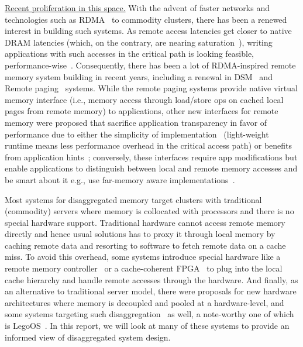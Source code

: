 \vspace{5pt}
\noindent \uline{Recent proliferation in this space.}
With the advent of faster networks and technologies such as 
RDMA~\cite{farm} to commodity clusters, there has been a renewed 
interest in building such systems. 
As remote access latencies 
get closer to native DRAM latencies (which, on the contrary, 
are nearing saturation~\cite{Aguilera2017}),
writing applications with such accesses 
in the critical path is looking feasible, 
performance-wise~\cite{netdisagg}. 
Consequently, there has been a lot of RDMA-inspired remote 
memory system building in recent years, including a renewal in
DSM~\cite{farm, gam,dspm,ltdsm} and Remote 
paging~\cite{Lim2012,bladedisagg1,infiniswap,zswap,fastswap,leap} 
systems. While the remote paging systems provide native virtual memory 
interface (i.e., memory access through load/store ops on cached 
local pages from remote memory) to applications, 
other new interfaces for remote memory were proposed that 
sacrifice application transparency in favor of performance 
due to either the simplicity of 
implementation~\cite{remregions,literdma} (light-weight runtime 
means less performance overhead in the critical access path) or 
benefits from application hints~\cite{aifm}; 
conversely, these interfaces require app modifications but
enable applications to distinguish between local and remote 
memory accesses and be smart about it e.g., use far-memory 
aware implementations~\cite{Aguilera2019,semeru}.

Most systems for disaggregated memory target clusters with 
traditional (commodity) servers where memory is collocated 
with processors and there is no special hardware support.
Traditional hardware cannot access remote memory directly 
 and hence usual solutions has to proxy it  
through local memory by caching remote data and resorting to 
software to fetch remote data on a cache miss. To avoid 
this overhead, some systems introduce special hardware 
like a remote memory controller~\cite{sonuma} or a 
cache-coherent FPGA~\cite{kona} to plug into 
the local cache hierarchy and handle remote accesses through 
the hardware. And finally, as an alternative to traditional 
server model, there were proposals for new 
hardware architectures where memory is decoupled and pooled
at a hardware-level, and some systems targeting such 
disaggregation~\cite{sonuma,bladedisagg1,legoos} as well, 
a note-worthy one of which is LegoOS~\cite{legoos}. In this 
report, we will look at many of these systems to provide an 
informed view of disaggregated system design.

